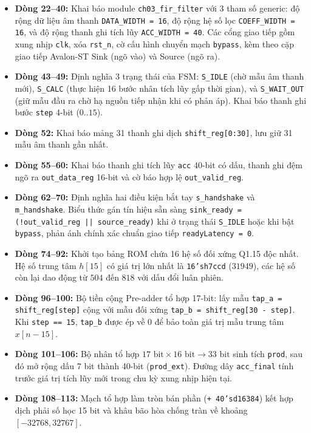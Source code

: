 \begin{itemize}[leftmargin=1.5em, itemsep=2pt]
    \item \textbf{Dòng 22--40:} Khai báo module \texttt{ch03\_fir\_filter} với 3 tham số generic: độ rộng dữ liệu âm thanh \texttt{DATA\_WIDTH = 16}, độ rộng hệ số lọc \texttt{COEFF\_WIDTH = 16}, và độ rộng thanh ghi tích lũy \texttt{ACC\_WIDTH = 40}. Các cổng giao tiếp gồm xung nhịp \texttt{clk}, xóa \texttt{rst\_n}, cờ cấu hình chuyển mạch \texttt{bypass}, kèm theo cặp giao tiếp Avalon-ST Sink (ngõ vào) và Source (ngõ ra).
    \item \textbf{Dòng 43--49:} Định nghĩa 3 trạng thái của FSM: \texttt{S\_IDLE} (chờ mẫu âm thanh mới), \texttt{S\_CALC} (thực hiện 16 bước nhân tích lũy gấp thời gian), và \texttt{S\_WAIT\_OUT} (giữ mẫu đầu ra chờ hạ nguồn tiếp nhận khi có phản áp). Khai báo thanh ghi bước \texttt{step} 4-bit ($0..15$).
    \item \textbf{Dòng 52:} Khai báo mảng 31 thanh ghi dịch \texttt{shift\_reg[0:30]}, lưu giữ 31 mẫu âm thanh gần nhất.
    \item \textbf{Dòng 55--60:} Khai báo thanh ghi tích lũy \texttt{acc} 40-bit có dấu, thanh ghi đệm ngõ ra \texttt{out\_data\_reg} 16-bit và cờ báo hợp lệ \texttt{out\_valid\_reg}.
    \item \textbf{Dòng 62--70:} Định nghĩa hai điều kiện bắt tay \texttt{s\_handshake} và \texttt{m\_handshake}. Biểu thức gán tín hiệu sẵn sàng \texttt{sink\_ready = (!out\_valid\_reg || source\_ready)} khi ở trạng thái \texttt{S\_IDLE} hoặc khi bật \texttt{bypass}, phản ánh chính xác chuẩn giao tiếp \texttt{readyLatency = 0}.
    \item \textbf{Dòng 74--92:} Khởi tạo bảng ROM chứa 16 hệ số đối xứng Q1.15 độc nhất. Hệ số trung tâm $h[15]$ có giá trị lớn nhất là \texttt{16'sh7ccd} ($31949$), các hệ số còn lại dao động từ $504$ đến $818$ với dấu đổi luân phiên.
    \item \textbf{Dòng 96--100:} Bộ tiền cộng Pre-adder tổ hợp 17-bit: lấy mẫu \texttt{tap\_a = shift\_reg[step]} cộng với mẫu đối xứng \texttt{tap\_b = shift\_reg[30 - step]}. Khi \texttt{step == 15}, \texttt{tap\_b} được ép về $0$ để bảo toàn giá trị mẫu trung tâm $x[n-15]$.
    \item \textbf{Dòng 101--106:} Bộ nhân tổ hợp $17\text{ bit} \times 16\text{ bit} \to 33\text{ bit}$ sinh tích \texttt{prod}, sau đó mở rộng dấu 7 bit thành 40-bit (\texttt{prod\_ext}). Đường dây \texttt{acc\_final} tính trước giá trị tích lũy mới trong chu kỳ xung nhịp hiện tại.
    \item \textbf{Dòng 108--113:} Mạch tổ hợp làm tròn bán phần (\texttt{+ 40'sd16384}) kết hợp dịch phải số học 15 bit và khâu bão hòa chống tràn về khoảng $[-32768, 32767]$.

\end{itemize}
